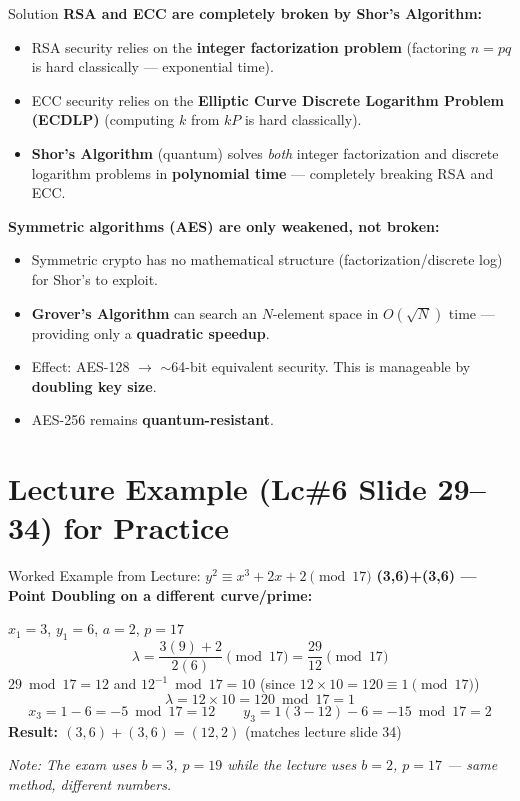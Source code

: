 \documentclass[12pt,a4paper]{article}
\begin{document}
\begin{solbox}{Solution}
\textbf{RSA and ECC are completely broken by Shor's Algorithm:}
\begin{itemize}[nosep]
  \item RSA security relies on the \textbf{integer factorization problem} (factoring $n=pq$ is hard classically — exponential time).
  \item ECC security relies on the \textbf{Elliptic Curve Discrete Logarithm Problem (ECDLP)} (computing $k$ from $kP$ is hard classically).
  \item \textbf{Shor's Algorithm} (quantum) solves \emph{both} integer factorization and discrete logarithm problems in \textbf{polynomial time} — completely breaking RSA and ECC.
\end{itemize}

\medskip
\textbf{Symmetric algorithms (AES) are only weakened, not broken:}
\begin{itemize}[nosep]
  \item Symmetric crypto has no mathematical structure (factorization/discrete log) for Shor's to exploit.
  \item \textbf{Grover's Algorithm} can search an $N$-element space in $O(\sqrt{N})$ time — providing only a \textbf{quadratic speedup}.
  \item Effect: AES-128 $\to$ $\sim$64-bit equivalent security. This is manageable by \textbf{doubling key size}.
  \item AES-256 remains \textbf{quantum-resistant}.
\end{itemize}
\end{solbox}

\vspace{1em}

\section{Lecture Example (Lc\#6 Slide 29--34) for Practice}

\begin{algobox}{Worked Example from Lecture: $y^2 \equiv x^3 + 2x + 2 \pmod{17}$}
\textbf{(3,6)+(3,6) --- Point Doubling on a different curve/prime:}

$x_1=3$, $y_1=6$, $a=2$, $p=17$
\[
  \lambda = \frac{3(9)+2}{2(6)} \pmod{17} = \frac{29}{12} \pmod{17}
\]
$29 \bmod 17 = 12$ and $12^{-1} \bmod 17 = 10$ (since $12 \times 10 = 120 \equiv 1 \pmod{17}$)
\[
  \lambda = 12 \times 10 = 120 \bmod 17 = 1
\]
\[
  x_3 = 1 - 6 = -5 \bmod 17 = 12 \qquad y_3 = 1(3-12)-6 = -15 \bmod 17 = 2
\]
\textbf{Result: $(3,6)+(3,6) = (12,2)$} (matches lecture slide 34)

\medskip
\textit{Note: The exam uses $b=3$, $p=19$ while the lecture uses $b=2$, $p=17$ --- same method, different numbers.}
\end{algobox}
\end{document}
